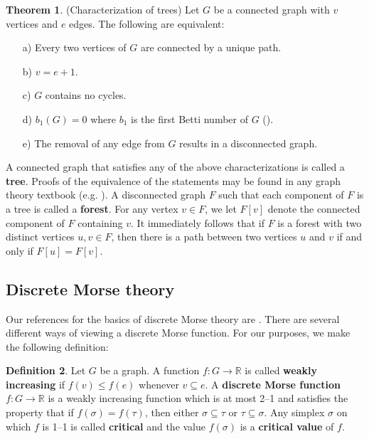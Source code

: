 \documentclass{article}
\theoremstyle{definition}
\newcommand{\RR}    {\mathbb{R}}
\newtheorem{thm}{Theorem}%
\newtheorem{defn}[thm]  {Definition}
\begin{document}
\begin{thm}\label{thm char of trees}(Characterization of trees) Let $G$ be a connected graph with $v$ vertices and $e$ edges. The following are equivalent:
\begin{enumerate}
    \item[a)] Every two vertices of $G$ are connected by a unique path.
    \item[b)] $v=e+1.$
    \item[c)] $G$ contains no cycles.
    \item[d)] $b_1(G)=0$ where $b_1$ is the first Betti number of $G$ (\cite[Chapter II.4]{Renzo}).
    \item[e)] The removal of any edge from $G$ results in a disconnected graph.
\end{enumerate}

\end{thm}

\noindent A connected graph that satisfies any of the above characterizations is called a \textbf{tree}. Proofs of the equivalence of the statements may be found in any graph theory textbook (e.g. \cite[Chapter 2.2]{Chartrand16}). A disconnected graph $F$ such that each component of $F$ is a tree is called a \textbf{forest}.  For any vertex $v\in F$, we let $F[v]$ denote the connected component of $F$ containing $v$. It immediately follows that if $F$ is a forest with two distinct vertices $u,v\in F$, then there is a path between two vertices $u$ and $v$ if and only if $F[u]=F[v]$.

\subsection{Discrete Morse theory}

Our references for the basics of discrete Morse theory are \cite{Forman-2002,KnudsonBook, Koz20, DMTSco}.  There are several different ways of viewing a discrete Morse function.  For our purposes, we make the following definition:


\begin{defn}\label{discreteMF}  Let $G$ be a graph.  A function $f\colon G \to \RR$ is called  \textbf{weakly increasing} if $f(v)\leq f(e)$ whenever $v \subseteq e$.  A \textbf{discrete Morse function} $f\colon G \to \RR$ is a weakly increasing function which is at most 2--1 and satisfies the property that if $f(\sigma)=f(\tau)$, then either $\sigma\subseteq \tau$ or $\tau\subseteq \sigma$. Any simplex $\sigma$ on which $f$ is 1--1 is called \textbf{critical} and the value $f(\sigma)$ is a \textbf{critical value} of $f$.
\end{defn}
\end{document}
